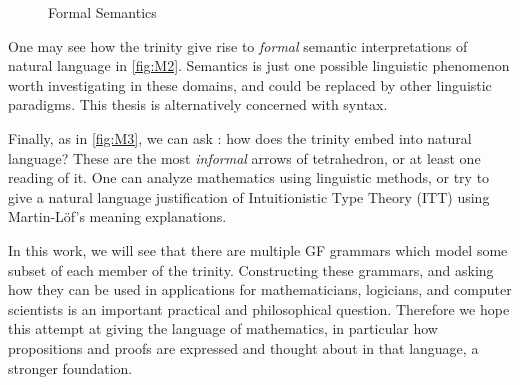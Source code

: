 \begin{figure}[H]
\centering
{}
\caption{Formal Semantics} \label{fig:M2}
\end{figure}

One may see how the trinity give rise to \emph{formal} semantic interpretations
of natural language in \autoref{fig:M2}. Semantics is just one possible
linguistic phenomenon worth investigating in these domains, and could be
replaced by other linguistic paradigms. This thesis is alternatively concerned
with syntax.

Finally, as in \autoref{fig:M3}, we can ask : how does the trinity embed into
natural language? These are the most \emph{informal} arrows of tetrahedron, or
at least one reading of it. One can analyze mathematics using linguistic
methods, or try to give a natural language justification of Intuitionistic Type
Theory (ITT) using Martin-Löf's meaning explanations.

In this work, we will see that there are multiple GF grammars which model some
subset of each member of the trinity. Constructing these grammars, and asking
how they can be used in applications for mathematicians, logicians, and computer
scientists is an important practical and philosophical question. Therefore we
hope this attempt at giving the language of mathematics, in particular how
propositions and proofs are expressed and thought about in that language, a
stronger foundation.


